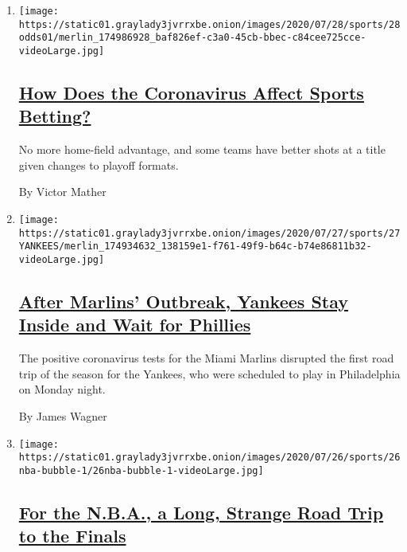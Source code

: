 \begin{enumerate}
\def\labelenumi{\arabic{enumi}.}
\item
  \texttt{[image: https://static01.graylady3jvrrxbe.onion/images/2020/07/28/sports/28odds01/merlin\_174986928\_baf826ef-c3a0-45cb-bbec-c84cee725cce-videoLarge.jpg]}

  \hypertarget{how-does-the-coronavirus-affect-sports-betting}{%
  \subsection{\texorpdfstring{\href{/2020/07/28/sports/coronavirus-sports-betting.html}{How
  Does the Coronavirus Affect Sports
  Betting?}}{How Does the Coronavirus Affect Sports Betting?}}\label{how-does-the-coronavirus-affect-sports-betting}}

  No more home-field advantage, and some teams have better shots at a
  title given changes to playoff formats.

  By Victor Mather
\item
  \texttt{[image: https://static01.graylady3jvrrxbe.onion/images/2020/07/27/sports/27YANKEES/merlin\_174934632\_138159e1-f761-49f9-b64c-b74e86811b32-videoLarge.jpg]}

  \hypertarget{after-marlins-outbreak-yankees-stay-inside-and-wait-for-phillies}{%
  \subsection{\texorpdfstring{\href{/2020/07/27/sports/baseball/coronavirus-yankees-marlins-phillies.html}{After
  Marlins' Outbreak, Yankees Stay Inside and Wait for
  Phillies}}{After Marlins' Outbreak, Yankees Stay Inside and Wait for Phillies}}\label{after-marlins-outbreak-yankees-stay-inside-and-wait-for-phillies}}

  The positive coronavirus tests for the Miami Marlins disrupted the
  first road trip of the season for the Yankees, who were scheduled to
  play in Philadelphia on Monday night.

  By James Wagner
\item
  \texttt{[image: https://static01.graylady3jvrrxbe.onion/images/2020/07/26/sports/26nba-bubble-1/26nba-bubble-1-videoLarge.jpg]}

  \hypertarget{for-the-nba-a-long-strange-road-trip-to-the-finals}{%
  \subsection{\texorpdfstring{\href{/2020/07/27/sports/basketball/coronavirus-nba-season-bubble-disney-world.html}{For
  the N.B.A., a Long, Strange Road Trip to the
  Finals}}{For the N.B.A., a Long, Strange Road Trip to the Finals}}\label{for-the-nba-a-long-strange-road-trip-to-the-finals}}


\end{enumerate}
